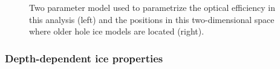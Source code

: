 \begin{figure}
    \centering
    
    
    \caption{Two parameter model used to parametrize the optical efficiency in this analysis (left) and the positions in this two-dimensional space where older hole ice models are located (right).}
    \label{fig:hole-ice-parametrization}
\end{figure}

\subsubsection{Depth-dependent ice properties}
\label{sec:depth-dependent-ice-properties}


